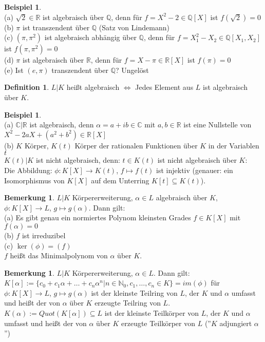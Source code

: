 \documentclass[10pt,a4paper,numbers=endperiod]{scrreprt}
\theoremstyle{definition}
\newtheorem{defi}[satz]{Definition}
\newtheorem{bem}[satz]{Bemerkung}
\newtheorem{bsp}[satz]{Beispiel}
\def\QQ{{\mathbb Q}}
\def\CC{{\mathbb C}}
\def\RR{{\mathbb R}}
\def\NN{{\mathbb N}}
\begin{document}
\begin{bsp}
	$ $\\
	(a) $\sqrt{2} \in \RR$ ist algebraisch über $\QQ$, denn für $f = X^2- 2\in \QQ[X]$ ist $f(\sqrt{2}) = 0$\\
	(b) $\pi$ ist transzendent über $\QQ$ (Satz von Lindemann)\\
	(c) $(\pi, \pi^2)$ ist algebraisch abhängig über $\QQ$, denn für $f = X_1^2-X_2 \in \QQ[X_1, X_2]$ ist $f(\pi, \pi^2) = 0$\\
	(d) $\pi$ ist algebraisch über $\RR$, denn für $f = X - \pi \in \RR[X]$ ist $f(\pi) = 0$\\
	(e) Ist $(e, \pi)$ transzendent über $\QQ$? Ungelöst
\end{bsp}

\begin{defi}
	$L|K$ heißt algebraisch $\Leftrightarrow$ Jedes Element aus $L$ ist algebraisch über $K$.
\end{defi}

\begin{bsp}
	$ $\\
	(a) $\CC|\RR$ ist algebraisch, denn $\alpha = a + ib \in \CC$ mit $a, b \in \RR$ ist eine Nullstelle von $X^2 - 2aX + (a^2 + b^2) \in \RR[X]$\\
	(b) $K$ Körper, $K(t)$ Körper der rationalen Funktionen über $K$ in der Variablen $t$\\
	$K(t)|K$ ist nicht algebraisch, denn: $t \in K(t)$ ist nicht algebraisch über $K$:\\
	Die Abbildung: $\phi: K[X] \rightarrow K(t)$, $f \mapsto f(t)$ ist injektiv (genauer: ein Isomorphismus von $K[X]$ auf dem Unterring $K[t] \subseteq K(t)$).
\end{bsp}

\begin{bem}
	$L|K$ Körpererweiterung, $\alpha \in L$ algebraisch über $K$, $\phi: K[X] \rightarrow L$, $g \mapsto g(\alpha)$. Dann gilt:\\
	(a) Es gibt genau ein normiertes Polynom kleinsten Grades $f \in K[X]$ mit $f(\alpha) = 0$\\
	(b) $f$ ist irreduzibel\\
	(c) $\ker(\phi) = (f)$\\
	$f$ heißt das Minimalpolynom von $\alpha$ über $K$.
\end{bem}

\begin{bem}
	$L|K$ Körpererweiterung, $\alpha \in L$. Dann gilt:\\
	$K[\alpha] := \{c_0 + c_1 \alpha + \ldots + c_n \alpha^n|n \in \NN_0, c_1, \ldots, c_n \in K\} = im(\phi)$ für $\phi: K[X] \rightarrow L$, $g \mapsto g(\alpha)$ ist der kleinste Teilring von $L$, der $K$ und $\alpha$ umfasst und heißt der von $\alpha$ über $K$ erzeugte Teilring von $L$.\\
	$K(\alpha) := Quot(K[\alpha]) \subseteq L$ ist der kleinste Teilkörper von $L$, der $K$ und $\alpha$ umfasst und heißt der von $\alpha$ über $K$ erzeugte Teilkörper von $L$ (''$K$ adjungiert $\alpha$'')
\end{bem}
\end{document}
